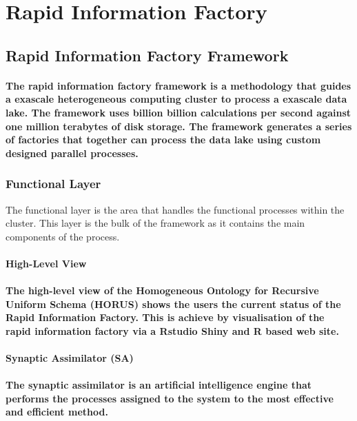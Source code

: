 \documentclass{acm_proc_article-sp}
\begin{document}
\newpage
\section{Rapid Information Factory}
\subsection{Rapid Information Factory Framework}
\paragraph{The rapid information factory framework is a methodology that guides a exascale \cite{bergman2008exascale} heterogeneous computing cluster to process a exascale data lake. The framework uses billion billion calculations per second against one million terabytes of disk storage. The framework generates a series of factories that together can process the data lake using custom designed parallel processes.}
\subsubsection{Functional Layer}
The functional layer is the area that handles the functional processes within the cluster.
This layer is the bulk of the framework as it contains the main components of the process.
\paragraph{\textbf{High-Level View}}
\paragraph{The high-level view of the Homogeneous Ontology for Recursive Uniform Schema (HORUS) shows the users the current status of the Rapid Information Factory. This is achieve by visualisation of the rapid information factory via a Rstudio Shiny \cite{ortega2013combining} and R \cite{team2000r} based web site.}
\paragraph{\textbf{Synaptic Assimilator (SA)}}
\paragraph{The synaptic assimilator is an artificial intelligence \cite{o2013artificial} engine that performs the processes assigned to the system to the most effective and efficient method.}
\end{document}
